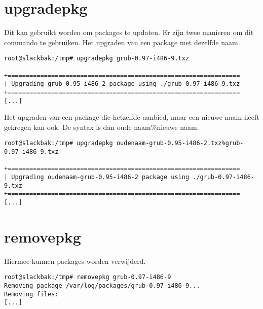 \section{upgradepkg}
Dit kan gebruikt worden om packages te updaten. Er zijn twee manieren om dit commando te gebruiken. Het upgraden van een package met dezelfde naam.
\begin{lstlisting}
root@slackbak:/tmp# upgradepkg grub-0.97-i486-9.txz 

+================================================================
| Upgrading grub-0.95-i486-2 package using ./grub-0.97-i486-9.txz
+================================================================
[...]
\end{lstlisting}
Het upgraden van een package die hetzelfde aanbied, maar een nieuwe naam heeft gekregen kan ook. De syntax is dan oude naam\%nieuwe naam.
\begin{lstlisting}
root@slackbak:/tmp# upgradepkg oudenaam-grub-0.95-i486-2.txz%grub-0.97-i486-9.txz 

+================================================================
| Upgrading oudenaam-grub-0.95-i486-2 package using ./grub-0.97-i486-9.txz
+================================================================
[...]
\end{lstlisting}

\section{removepkg}
Hiermee kunnen packages worden verwijderd.
\begin{lstlisting}
root@slackbak:/tmp# removepkg grub-0.97-i486-9
Removing package /var/log/packages/grub-0.97-i486-9...
Removing files:
[...]
\end{lstlisting}
